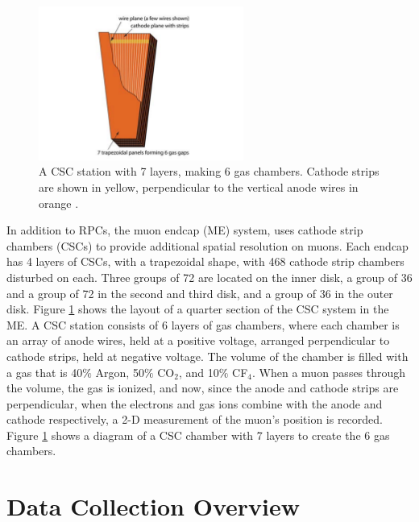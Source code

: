 \begin{figure}[h]
   \centering
  \includegraphics[width=0.6\textwidth]{Figures/CMS_Diagrams/Muon__CSC.pdf}
  \caption{A CSC station with 7 layers, making 6 gas chambers.
    Cathode strips are shown in yellow, perpendicular to the vertical
    anode wires in orange
    \cite{CMS:CMS_Machine_Chatrchyan:2008aa}. } \label{fig:muon_csc_layout} 
\end{figure}

\par In addition to RPCs, the muon endcap (ME) system, uses cathode
strip chambers (CSCs) to provide additional spatial resolution on
muons.  Each endcap has 4 layers of CSCs, with a trapezoidal shape,
with 468 cathode strip chambers disturbed on each.  Three groups of 72
are located on the inner disk, a group of 36 and a group of 72 in the
second and third disk, and a group of 36 in the outer disk.  Figure
\ref{fig:muon_csc_layout} shows the layout of a quarter section of the
CSC system in the ME.  A CSC station consists of 6 layers of gas
chambers, where each chamber is an array of anode wires, held at a
positive voltage, arranged perpendicular to cathode strips, held at
negative voltage.  The volume of the chamber is filled with a gas that 
is 40$\%$ Argon, 50$\%$ CO$_{2}$, and 10$\%$ CF$_{4}$.  When a muon
passes through the volume, the gas is ionized, and now, since the
anode and cathode strips are perpendicular, when the electrons and gas
ions combine with the anode and cathode respectively, a 2-D
measurement of the muon's position is recorded.  Figure
\ref{fig:muon_csc_layout} shows a diagram of a CSC chamber with 7
layers to create the 6 gas chambers.  

\section{Data Collection Overview}
\label{data_collection_description}

